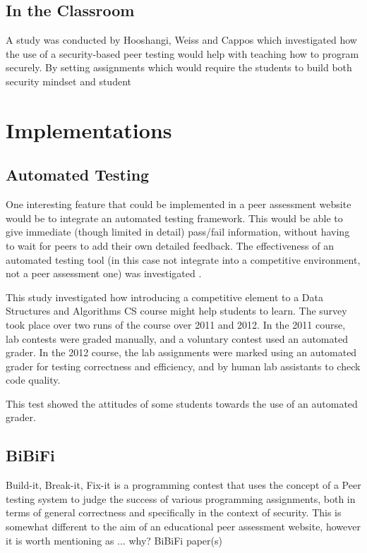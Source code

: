 \documentclass[a4paper,11pt]{report}
\begin{document}
\subsection{}

\subsection{In the Classroom}
A study was conducted by Hooshangi, Weiss and Cappos \cite{hooshangi_can_2015} which investigated how the use of a security-based peer testing would help with teaching how to program securely. By setting assignments which would require the students to build both 
security mindset and student

\section{Implementations}

\subsection{Automated Testing}
One interesting feature that could be implemented in a peer assessment website would be to integrate an automated testing framework. This would be able to give immediate (though limited in detail) pass/fail information, without having to wait for peers to add their own detailed feedback. The effectiveness of an automated testing tool (in this case not integrate into a competitive environment, not a peer assessment one) was investigated \cite{farnqvist_competition_2016}.\par
This study investigated how introducing a competitive element to a Data Structures and Algorithms CS course might help students to learn. The survey took place over two runs of the course over 2011 and 2012. In the 2011 course, lab contests were graded manually, and a voluntary contest used an automated grader. In the 2012 course, the lab assignments were marked using an automated grader for testing correctness and efficiency, and by human lab assistants to check code quality.\par
This test showed the attitudes of some students towards the use of an automated grader.

\subsection{BiBiFi}
Build-it, Break-it, Fix-it\cite{ruef_build_2016}\cite{ruef_build_2015} is a programming contest that uses the concept of a Peer testing system to judge the success of various programming assignments, both in terms of general correctness and specifically in the context of security. This is somewhat different to the aim of an educational peer assessment website, however it is worth mentioning as ... why?
BiBiFi paper(s)\par
\end{document}
